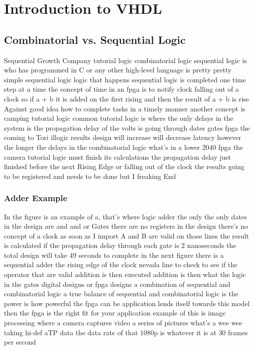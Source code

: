 \chapter{Introduction to VHDL}
\section{Combinatorial vs. Sequential Logic}
Sequential Growth Company tutorial logic combinatorial logic sequential logic is who has programmed in C or any other high-level language is pretty pretty simple sequential logic logic that happens sequential logic is completed one time step at a time the concept of time in an fpga is to notify clock falling out of a clock so if a + b it is added on the first rising and then the result of a + b is rise Against good idea how to complete tasks in a timely manner another concept is camping tutorial logic common tutorial logic is where the only delays in the system is the propagation delay of the volts is going through dates gates fpga the coming to Tori illogic results design will increase will decrease latency however the longer the delays in the combinatorial logic what's in a lower 2040 fpga the camera tutorial logic must finish its calculations the propagation delay just finished before the next Rising Edge or falling out of the clock the results going to be registered and needs to be done but I freaking End

\subsection{Adder Example}
In the figure is an example of a, that's where logic adder the only the only dates in the design are and and or Gates there are no registers in the design there's no concept of a clock as soon as I import A and B are valid on those lines the result is calculated if the propagation delay through each gate is 2 nanoseconds the total design will take 49 seconds to complete in the next figure there is a sequential adder the rising edge of the clock nevada line to check to see if the operator that are valid addition is then executed addition is then what the logic in the gates digital designs or fpga designs a combination of sequential and combinatorial logic a true balance of sequential and combinatorial logic is the power is how powerful the fpga can be application lends itself towards this model then the fpga is the right fit for your application example of this is image processing where a camera captures video a series of pictures what's a wee wee taking hi-def aTP data the data rate of that 1080p is whatever it is at 30 frames per second 

